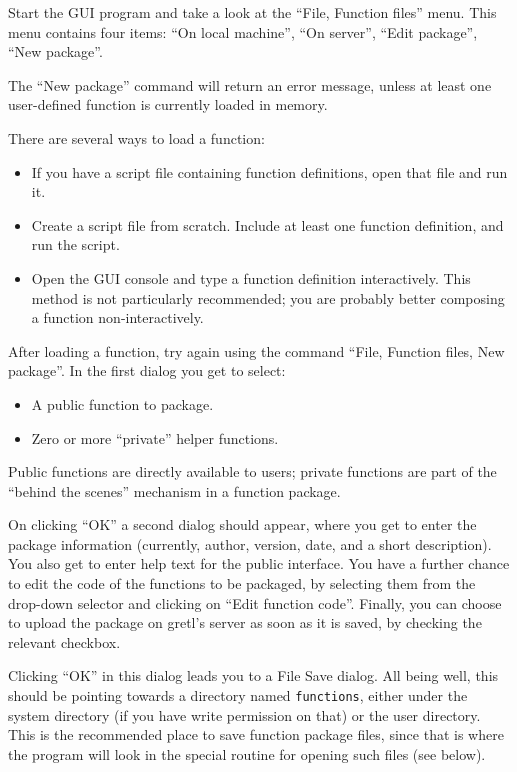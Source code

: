 Start the GUI program and take a look at the ``File, Function files'' menu.
This menu contains four items: ``On local machine'', ``On server'', ``Edit
package'', ``New package''.

The ``New package'' command will return an error message, unless at least one
user-defined function is currently loaded in memory.

There are several ways to load a function:

\begin{itemize}
\item If you have a script file containing function definitions, open
  that file and run it.
\item Create a script file from scratch.  Include at least one
  function definition, and run the script.
\item Open the GUI console and type a function definition
  interactively.  This method is not particularly recommended; you are
  probably better composing a function non-interactively.
\end{itemize}

After loading a function, try again using the command ``File, Function
files, New package''. In the first dialog you get to select:

\begin{itemize}
\item A public function to package.
\item Zero or more ``private'' helper functions.
\end{itemize}

Public functions are directly available to users; private functions are
part of the ``behind the scenes'' mechanism in a function package.

On clicking ``OK'' a second dialog should appear, where you get to
enter the package information (currently, author, version, date, and a
short description).  You also get to enter help text for the public
interface.  You have a further chance to edit the code of the functions
to be packaged, by selecting them from the drop-down selector and
clicking on ``Edit function code''. Finally, you can choose to upload
the package on gretl's server as soon as it is saved, by checking the
relevant checkbox.

Clicking ``OK'' in this dialog leads you to a File Save dialog.  All
being well, this should be pointing towards a directory named
\texttt{functions}, either under the  system directory (if
you have write permission on that) or the  user directory.
This is the recommended place to save function package files, since
that is where the program will look in the special routine for opening
such files (see below).

